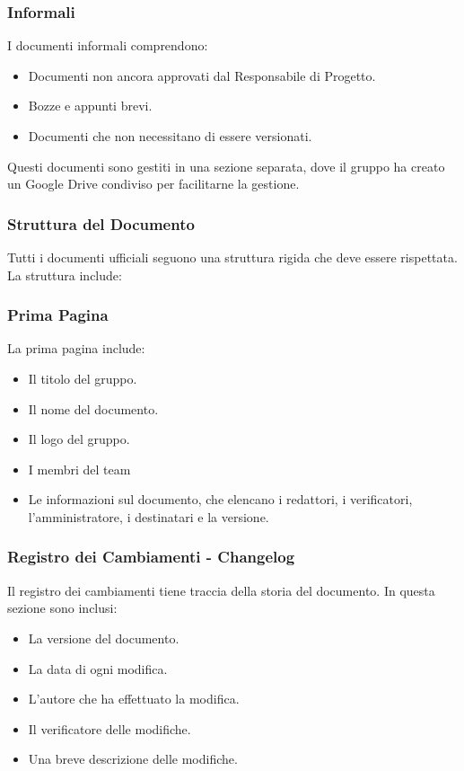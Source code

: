 \subsubsection*{Informali}
I documenti informali comprendono:
\begin{itemize}
    \item Documenti non ancora approvati dal Responsabile di Progetto.
    \item Bozze e appunti brevi.
    \item Documenti che non necessitano di essere versionati.
\end{itemize}
Questi documenti sono gestiti in una sezione separata, dove il gruppo ha creato un Google Drive condiviso per 
facilitarne la gestione.

\subsubsection{Struttura del Documento}

Tutti i documenti ufficiali seguono una struttura rigida che deve essere rispettata. La struttura include:

\subsubsection*{Prima Pagina}
La prima pagina include:
\begin{itemize}
    \item Il titolo del gruppo.
    \item Il nome del documento.
    \item Il logo del gruppo.
    \item I membri del team
    \item Le informazioni sul documento, che elencano i redattori, i verificatori, l’amministratore, i destinatari e la versione.
\end{itemize}

\subsubsection*{Registro dei Cambiamenti - Changelog}
Il registro dei cambiamenti tiene traccia della storia del documento. In questa sezione sono inclusi:
\begin{itemize}
    \item La versione del documento.
    \item La data di ogni modifica.
    \item L'autore che ha effettuato la modifica.
    \item Il verificatore delle modifiche.
    \item Una breve descrizione delle modifiche.
\end{itemize}

